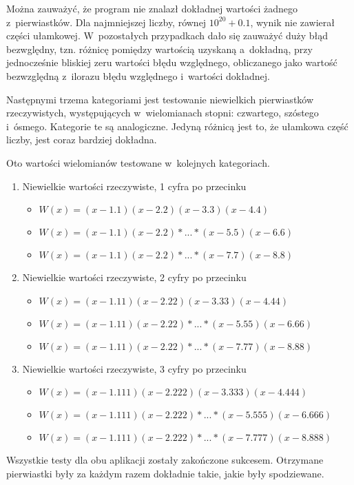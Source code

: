Można zauważyć, że program nie znalazł dokładnej wartości żadnego z~pierwiastków. Dla najmniejszej liczby, równej $10^{20}+0.1$, wynik nie zawierał części ułamkowej. W~pozostałych przypadkach dało się zauważyć duży błąd bezwględny, tzn. różnicę pomiędzy wartością uzyskaną a~dokładną, przy jednocześnie bliskiej zeru wartości błędu względnego, obliczanego jako wartość bezwzględną z~ilorazu błędu względnego i~wartości dokładnej.

Następnymi trzema kategoriami jest testowanie niewielkich pierwiastków rzeczywistych, występujących w~wielomianach stopni: czwartego, szóstego i~ósmego. Kategorie te są analogiczne. Jedyną różnicą jest to, że ułamkowa część liczby, jest coraz bardziej dokładna.

Oto wartości wielomianów testowane w~kolejnych kategoriach.

\begin{enumerate}
	\item Niewielkie wartości rzeczywiste, 1 cyfra po przecinku
	\begin{itemize}
		\item $W(x)=(x-1.1)(x-2.2)(x-3.3)(x-4.4)$
		\item $W(x)=(x-1.1)(x-2.2)*...*(x-5.5)(x-6.6)$
		\item $W(x)=(x-1.1)(x-2.2)*...*(x-7.7)(x-8.8)$
	\end{itemize}
	\item Niewielkie wartości rzeczywiste, 2 cyfry po przecinku
	\begin{itemize}
		\item $W(x)=(x-1.11)(x-2.22)(x-3.33)(x-4.44)$
		\item $W(x)=(x-1.11)(x-2.22)*...*(x-5.55)(x-6.66)$
		\item $W(x)=(x-1.11)(x-2.22)*...*(x-7.77)(x-8.88)$
	\end{itemize}
	\item Niewielkie wartości rzeczywiste, 3 cyfry po przecinku
	\begin{itemize}
		\item $W(x)=(x-1.111)(x-2.222)(x-3.333)(x-4.444)$
		\item $W(x)=(x-1.111)(x-2.222)*...*(x-5.555)(x-6.666)$
		\item $W(x)=(x-1.111)(x-2.222)*...*(x-7.777)(x-8.888)$
	\end{itemize}
\end{enumerate}

Wszystkie testy dla obu aplikacji zostały zakończone sukcesem. Otrzymane pierwiastki były za każdym razem dokładnie takie, jakie były spodziewane.

